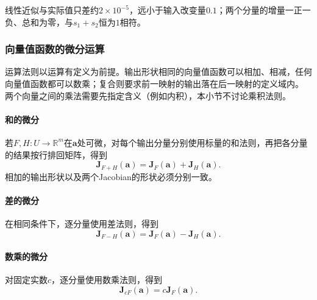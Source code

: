 线性近似与实际值只差约$2\times10^{-5}$，远小于输入改变量$0.1$；两个分量的增量一正一负、总和为零，与$s_1+s_2$恒为$1$相符。

\subsubsection{向量值函数的微分运算}
\label{sec:analysis-vector-chain-matrix-calculus}

运算法则以运算有定义为前提。输出形状相同的向量值函数可以相加、相减，任何向量值函数都可以数乘；复合则要求前一映射的输出落在后一映射的定义域内。
两个向量之间的乘法需要先指定含义（例如内积），本小节不讨论乘积法则。

\paragraph{和的微分}
若$F,H:U\to\mathbb R^m$在$\bm a$处可微，对每个输出分量分别使用标量的和法则，再把各分量的结果按行排回矩阵，得到
\[
 \bm J_{F+H}(\bm a)=\bm J_F(\bm a)+\bm J_H(\bm a).
\]
相加的输出形状以及两个Jacobian的形状必须分别一致。

\paragraph{差的微分}
在相同条件下，逐分量使用差法则，得到
\[
 \bm J_{F-H}(\bm a)=\bm J_F(\bm a)-\bm J_H(\bm a).
\]

\paragraph{数乘的微分}
对固定实数$c$，逐分量使用数乘法则，得到
\[
 \bm J_{cF}(\bm a)=c\bm J_F(\bm a).
\]


